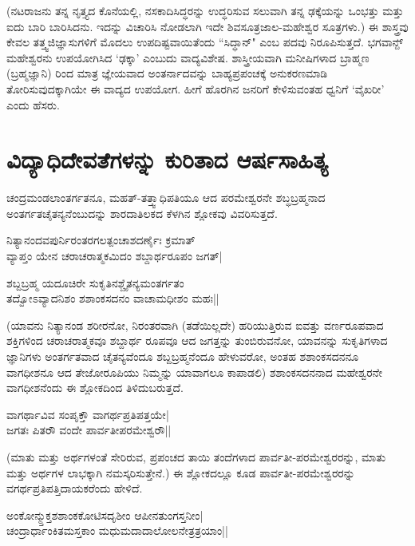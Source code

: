 (ನಟರಾಜನು ತನ್ನ ನೃತ್ತ್ಯದ ಕೊನೆಯಲ್ಲಿ, ನಸಕಾದಿಸಿದ್ಧರನ್ನು ಉದ್ಧರಿಸುವ ಸಲುವಾಗಿ ತನ್ನ ಢಕ್ಕೆಯನ್ನು ಒಂಭತ್ತು ಮತ್ತು ಐದು ಬಾರಿ ಬಾರಿಸಿದನು. ಇದನ್ನು ವಿಚಾರಿಸಿ ನೋಡಲಾಗಿ ಇದೇ ಶಿವಸೂತ್ರಜಾಲ-ಮಹೇಶ್ವರ ಸೂತ್ರಗಳು.) ಈ ಶಾಸ್ತ್ರವು ಕೇವಲ ತತ್ತ್ವಜಿಜ್ಞಾಸುಗಳಿಗೆ ಮೊದಲು ಉಪದಿಷ್ಟವಾಯಿತೆಂದು ``ಸಿದ್ಧಾನ್" ಎಂಬ ಪದವು ನಿರೂಪಿಸುತ್ತದೆ. ಭಗವಾನ್ೞ್ ಮಹೇಶ್ವರನು ಉಪಯೋಗಿಸಿದ `ಢಕ್ಕಾ' ಎಂಬುದು ವಾದ್ಯವಿಶೇಷ. ಶಾಸ್ತ್ರೀಯವಾಗಿ ಮನೀಷಿಗಳಾದ ಬ್ರಾಹ್ಮಣ (ಬ್ರಹ್ಮಜ್ಞಾನಿ) ರಿಂದ ಮಾತ್ರ ಜ್ಞೇಯವಾದ ಅಂತರ್ನಾದವನ್ನು ಬಾಹ್ಯಪ್ರಪಂಚಕ್ಕೆ ಅನುಕರಣಮಾಡಿ ತೋರಿಸುವುದಕ್ಕಾಗಿಯೇ ಈ ವಾದ್ಯದ ಉಪಯೋಗ. ಹೀಗೆ ಹೊರಗಿನ ಜನರಿಗೆ ಕೇಳಿಸುವಂತಹ ಧ್ವನಿಗೆ `ವೈಖರೀ' ಎಂದು ಹೆಸರು.

\section*{ವಿದ್ಯಾಧಿದೇವತೆಗಳನ್ನು ಕುರಿತಾದ ಆರ್ಷಸಾಹಿತ್ಯ}

ಚಂದ್ರಮಂಡಲಾಂತರ್ಗತನೂ, ಮಹತ್-ತತ್ತ್ವಾಧಿಪತಿಯೂ ಆದ ಪರಮೇಶ್ವರನೇ ಶಬ್ಧಬ್ರಹ್ಮನಾದ ಅಂತರ್ಗತಚೈತನ್ಯನೆಂಬುದನ್ನು ಶಾರದಾತಿಲಕದ ಕೆಳಗಿನ ಶ್ಲೋಕವು ವಿವರಿಸುತ್ತದೆ.

\begin{shloka}
ನಿತ್ಯಾನಂದವಪುರ್ನಿರಂತರಗಲತ್ಪಂಚಾಶದರ್ಣೈಃ ಕ್ರಮಾತ್\\
ವ್ಯಾಪ್ತಂ ಯೇನ ಚರಾಚರಾತ್ಮಕಮಿದಂ ಶಬ್ದಾರ್ಥರೂಪಂ ಜಗತ್|
\end{shloka}
\begin{shloka}
ಶಬ್ದಬ್ರಹ್ಮ ಯದೂಚಿರೇ ಸುಕೃತಿನಶ್ಚೈತನ್ಯಮಂತರ್ಗತಂ\\
ತದ್ವೋಽವ್ಯಾದನಿಶಂ ಶಶಾಂಕಸದನಂ ವಾಚಾಮಧೀಶಂ ಮಹಃ||
\end{shloka}

(ಯಾವನು ನಿತ್ಯಾನಂಡ ಶರೀರನೋ, ನಿರಂತರವಾಗಿ (ತಡೆಯಿಲ್ಲದೇ) ಹರಿಯುತ್ತಿರುವ ಐವತ್ತು ವರ್ಣರೂಪವಾದ ಶಕ್ತಿಗಳಿಂದ ಚರಾಚರಾತ್ಮಕವೂ ಶಬ್ದಾರ್ಥ ರೂಪವೂ ಆದ ಜಗತ್ತನ್ನು ತುಂಬಿರುವನೋ, ಯಾವನನ್ನು ಸುಕೃತಿಗಳಾದ ಜ್ಞಾನಿಗಳು ಅಂತರ್ಗತವಾದ ಚೈತನ್ಯವೆಂದೂ ಶಬ್ದಬ್ರಹ್ಮನೆಂದೂ ಹೇಳುವರೋ, ಅಂತಹ ಶಶಾಂಕಸದನನೂ ವಾಗಧೀಶನೂ ಆದ ತೇಜೋರೂಪಿಯು ನಿಮ್ಮನ್ನು ಯಾವಾಗಲೂ ಕಾಪಾಡಲಿ) ಶಶಾಂಕಸದನನಾದ ಮಹೇಶ್ವರನೇ ವಾಗಧೀಶನೆಂದು ಈ ಶ್ಲೋಕದಿಂದ ತಿಳಿದುಬರುತ್ತದೆ.
\begin{shloka}
ವಾಗರ್ಥಾವಿವ ಸಂಪೃಕ್ತೌ ವಾಗರ್ಥಪ್ರತಿಪತ್ತಯೇ|\\
ಜಗತಃ ಪಿತರೌ ವಂದೇ ಪಾರ್ವತೀಪರಮೇಶ್ವರೌ||
\end{shloka}

(ಮಾತು ಮತ್ತು ಅರ್ಥಗಳಂತೆ ಸೇರಿರುವ, ಪ್ರಪಂಚದ ತಾಯಿ ತಂದೆಗಳಾದ ಪಾರ್ವತೀ-ಪರಮೇಶ್ವರರನ್ನು, ಮಾತು ಮತ್ತು ಅರ್ಥಗಳ ಲಾಭಕ್ಕಾಗಿ ನಮಸ್ಕರಿಸುತ್ತೇನೆ.) ಈ ಶ್ಲೋಕದಲ್ಲೂ ಕೂಡ ಪಾರ್ವತೀ-ಪರಮೇಶ್ವರರನ್ನು ವಗರ್ಥಪ್ರತಿಪತ್ತಿದಾಯಕರೆಂದು ಹೇಳಿದೆ.

\begin{shloka}
ಅಂಕೋನ್ಮ್ತುಕ್ತಶಶಾಂಕಕೋಟಿಸದೃಶೀಂ ಆಪೀನತುಂಗಸ್ತನೀಂ|\\
ಚಂದ್ರಾರ್ಧಾಂಕಿತಮಸ್ತಕಾಂ ಮಧುಮದಾದಾಲೋಲನೇತ್ರತ್ರಯಾಂ||
\end{shloka}

